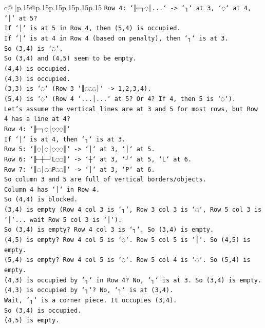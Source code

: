 \documentclass{article}
\begin{document}
{\begin{supertabular}{c@{$\;$}|p{.15\linewidth}@{}p{.15\linewidth}p{.15\linewidth}p{.15\linewidth}p{.15\linewidth}p{.15\linewidth}}
{{{\texttt{Row 4: `╟─┐◌│...` {-}> `┐` at 3, `◌` at 4, `│` at 5?} \\
\texttt{If `│` is at 5 in Row 4, then (5,4) is occupied.} \\
\texttt{If `│` is at 4 in Row 4 (based on penalty), then `┐` is at 3.} \\
\texttt{So (3,4) is `◌`.} \\
\texttt{So (3,4) and (4,5) seem to be empty.} \\
\texttt{(4,4) is occupied.} \\
\texttt{(4,3) is occupied.} \\
\texttt{(3,3) is `◌` (Row 3 `║◌◌◌│` {-}> 1,2,3,4).} \\
\texttt{(5,4) is `◌` (Row 4 `...│...` at 5? Or 4? If 4, then 5 is `◌`).} \\
\texttt{Let's assume the vertical lines are at 3 and 5 for most rows, but Row 4 has a line at 4?} \\
\texttt{Row 4: `╟─┐◌│◌◌◌║`} \\
\texttt{If `│` is at 4, then `┐` is at 3.} \\
\texttt{Row 5: `║◌│◌│◌◌◌║` {-}> `│` at 3, `│` at 5.} \\
\texttt{Row 6: `╟─┼─┘L◌◌║` {-}> `┼` at 3, `┘` at 5, `L` at 6.} \\
\texttt{Row 7: `║◌│◌◌P◌◌║` {-}> `│` at 3, `P` at 6.} \\
\texttt{So column 3 and 5 are full of vertical borders/objects.} \\
\texttt{Column 4 has `│` in Row 4.} \\
\texttt{So (4,4) is blocked.} \\
\texttt{(3,4) is empty (Row 4 col 3 is `┐`, Row 3 col 3 is `◌`, Row 5 col 3 is `│`... wait Row 5 col 3 is `│`).} \\
\texttt{So (3,4) is empty? Row 4 col 3 is `┐`. So (3,4) is empty.} \\
\texttt{(4,5) is empty? Row 4 col 5 is `◌`. Row 5 col 5 is `│`. So (4,5) is empty.} \\
\texttt{(5,4) is empty? Row 4 col 5 is `◌`. Row 5 col 4 is `◌`. So (5,4) is empty.} \\
\texttt{(4,3) is occupied by `┐` in Row 4? No, `┐` is at 3. So (3,4) is empty. (4,3) is occupied by `┐`? No, `┐` is at (3,4).} \\
\texttt{Wait, `┐` is a corner piece. It occupies (3,4).} \\
\texttt{So (3,4) is occupied.} \\
\texttt{(4,5) is empty.} \\
}}}
\end{supertabular}}
\end{document}
